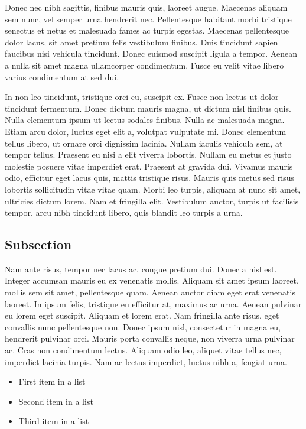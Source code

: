 \documentclass[10pt, a4paper, twocolumn]{article} %
\begin{document}
Donec nec nibh sagittis, finibus mauris quis, laoreet augue. Maecenas aliquam sem nunc, vel semper urna hendrerit nec. Pellentesque habitant morbi tristique senectus et netus et malesuada fames ac turpis egestas. Maecenas pellentesque dolor lacus, sit amet pretium felis vestibulum finibus. Duis tincidunt sapien faucibus nisi vehicula tincidunt. Donec euismod suscipit ligula a tempor. Aenean a nulla sit amet magna ullamcorper condimentum. Fusce eu velit vitae libero varius condimentum at sed dui.

In non leo tincidunt, tristique orci eu, suscipit ex. Fusce non lectus ut dolor tincidunt fermentum. Donec dictum mauris magna, ut dictum nisl finibus quis. Nulla elementum ipsum ut lectus sodales finibus. Nulla ac malesuada magna. Etiam arcu dolor, luctus eget elit a, volutpat vulputate mi. Donec elementum tellus libero, ut ornare orci dignissim lacinia. Nullam iaculis vehicula sem, at tempor tellus. Praesent eu nisi a elit viverra lobortis. Nullam eu metus et justo molestie posuere vitae imperdiet erat. Praesent at gravida dui. Vivamus mauris odio, efficitur eget lacus quis, mattis tristique risus. Mauris quis metus sed risus lobortis sollicitudin vitae vitae quam. Morbi leo turpis, aliquam at nunc sit amet, ultricies dictum lorem. Nam et fringilla elit. Vestibulum auctor, turpis ut facilisis tempor, arcu nibh tincidunt libero, quis blandit leo turpis a urna.


\subsection{Subsection}

Nam ante risus, tempor nec lacus ac, congue pretium dui. Donec a nisl est. Integer accumsan mauris eu ex venenatis mollis. Aliquam sit amet ipsum laoreet, mollis sem sit amet, pellentesque quam. Aenean auctor diam eget erat venenatis laoreet. In ipsum felis, tristique eu efficitur at, maximus ac urna. Aenean pulvinar eu lorem eget suscipit. Aliquam et lorem erat. Nam fringilla ante risus, eget convallis nunc pellentesque non. Donec ipsum nisl, consectetur in magna eu, hendrerit pulvinar orci. Mauris porta convallis neque, non viverra urna pulvinar ac. Cras non condimentum lectus. Aliquam odio leo, aliquet vitae tellus nec, imperdiet lacinia turpis. Nam ac lectus imperdiet, luctus nibh a, feugiat urna.

\begin{itemize}
	\item First item in a list 
	\item Second item in a list 
	\item Third item in a list
\end{itemize}
\end{document}
